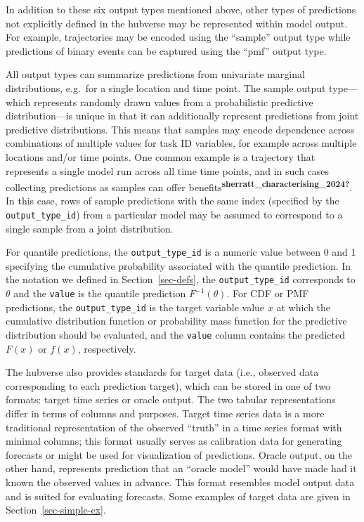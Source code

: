 \documentclass[
]{article}
\begin{document}
In addition to these six output types mentioned above, other types of
predictions not explicitly defined in the hubverse may be represented
within model output. For example, trajectories may be encoded using the
``sample'' output type while predictions of binary events can be
captured using the ``pmf'' output type.

All output types can summarize predictions from univariate marginal
distributions, e.g.~for a single location and time point. The sample
output type---which represents randomly drawn values from a
probabilistic predictive distribution---is unique in that it can
additionally represent predictions from joint predictive distributions.
This means that samples may encode dependence across combinations of
multiple values for task ID variables, for example across multiple
locations and/or time points. One common example is a trajectory that
represents a single model run across all time time points, and in such
cases collecting predictions as samples can offer
benefits\textsuperscript{\textbf{sherratt\_characterising\_2024?}}. In
this case, rows of sample predictions with the same index (specified by
the \texttt{output\_type\_id}) from a particular model may be assumed to
correspond to a single sample from a joint distribution.

For quantile predictions, the \texttt{output\_type\_id} is a numeric
value between 0 and 1 specifying the cumulative probability associated
with the quantile prediction. In the notation we defined in
Section~\ref{sec-defs}, the \texttt{output\_type\_id} corresponds to
\(\theta\) and the \texttt{value} is the quantile prediction
\(F^{-1}(\theta)\). For CDF or PMF predictions, the
\texttt{output\_type\_id} is the target variable value \(x\) at which
the cumulative distribution function or probability mass function for
the predictive distribution should be evaluated, and the \texttt{value}
column contains the predicted \(F(x)\) or \(f(x)\), respectively.

The hubverse also provides standards for target data (i.e., observed
data corresponding to each prediction target), which can be stored in
one of two formats: target time series or oracle output. The two tabular
representations differ in terms of columns and purposes. Target time
series data is a more traditional representation of the observed
``truth'' in a time series format with minimal columns; this format
usually serves as calibration data for generating forecasts or might be
used for visualization of predictions. Oracle output, on the other hand,
represents prediction that an ``oracle model'' would have made had it
known the observed values in advance. This format resembles model output
data and is suited for evaluating forecasts. Some examples of target
data are given in Section~\ref{sec-simple-ex}.
\end{document}
